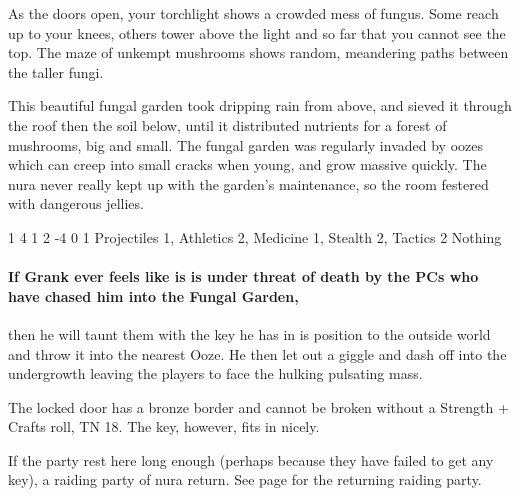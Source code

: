 \begin{multicols}{2}

\begin{boxtext}

	As the doors open, your torchlight shows a crowded mess of fungus.
	Some reach up to your knees, others tower above the light and so far that you cannot see the top.
	The maze of unkempt mushrooms shows random, meandering paths between the taller fungi.

\end{boxtext}

\begin{exampletext}

	This beautiful fungal garden took dripping rain from above, and sieved it through the roof then the soil below, until it distributed nutrients for a forest of mushrooms, big and small.
	The fungal garden was regularly invaded by oozes which can creep into small cracks when young, and grow massive quickly.
	The nura never really kept up with the garden's maintenance, so the room festered with dangerous jellies.

\end{exampletext}

\jelly

\jelly

\label{grank}
{1}%
{4}%
{{1}%
{2}%
{-4}}%
{0}%
{1}%
{Projectiles 1, Athletics 2, Medicine 1, Stealth 2, Tactics 2%
}%
{Nothing}%
{}

\paragraph{If Grank ever feels like is is under threat of death by the PCs who have chased him into the Fungal Garden,}
then he will taunt them with the key he has in is position to the outside world and throw it into the nearest  Ooze. He then let out a giggle and dash off into the undergrowth leaving the players to face the hulking pulsating mass.



The locked door has a bronze border and cannot be broken without a Strength + Crafts roll, TN 18.
The key, however, fits in nicely.

If the party rest here long enough (perhaps because they have failed to get any key), a raiding party of nura return.
See page \pageref{raidingParty} for the returning raiding party.



\end{multicols}


